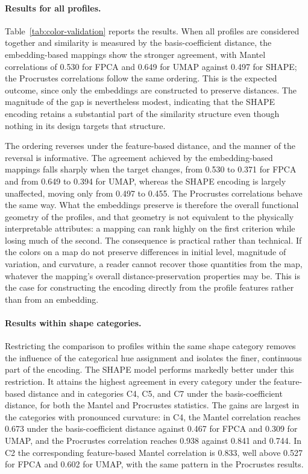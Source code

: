 \documentclass[11pt]{article}
\theoremstyle{plain}
\begin{document}
\paragraph{Results for all profiles.}
Table~\ref{tab:color-validation} reports the results. When all profiles are
considered together and similarity is measured by the basis-coefficient
distance, the embedding-based mappings show the stronger agreement, with Mantel
correlations of 0.530 for FPCA and 0.649 for UMAP against 0.497 for SHAPE; the
Procrustes correlations follow the same ordering. This is the expected outcome,
since only the embeddings are constructed to preserve distances. The magnitude
of the gap is nevertheless modest, indicating that the SHAPE encoding retains a
substantial part of the similarity structure even though nothing in its design
targets that structure.

The ordering reverses under the feature-based distance, and the manner of the
reversal is informative. The agreement achieved by the embedding-based mappings
falls sharply when the target changes, from 0.530 to 0.371 for FPCA and from
0.649 to 0.394 for UMAP, whereas the SHAPE encoding is largely unaffected,
moving only from 0.497 to 0.455. The Procrustes correlations behave the same
way. What the embeddings preserve is therefore the overall functional geometry
of the profiles, and that geometry is not equivalent to the physically
interpretable attributes: a mapping can rank highly on the first criterion while
losing much of the second. The consequence is practical rather than technical.
If the colors on a map do not preserve differences in initial level, magnitude
of variation, and curvature, a reader cannot recover those quantities from the
map, whatever the mapping's overall distance-preservation properties may be.
This is the case for constructing the encoding directly from the profile
features rather than from an embedding.

\paragraph{Results within shape categories.}
Restricting the comparison to profiles within the same shape category removes
the influence of the categorical hue assignment and isolates the finer,
continuous part of the encoding. The SHAPE model performs markedly better under
this restriction. It attains the highest agreement in every category under the
feature-based distance and in categories C4, C5, and C7 under the
basis-coefficient distance, for both the Mantel and Procrustes statistics. The
gains are largest in the categories with pronounced curvature: in C4, the Mantel
correlation reaches 0.673 under the basis-coefficient distance against 0.467 for
FPCA and 0.309 for UMAP, and the Procrustes correlation reaches 0.938 against
0.841 and 0.744. In C2 the corresponding feature-based Mantel correlation is
0.833, well above 0.527 for FPCA and 0.602 for UMAP, with the same pattern in
the Procrustes results.
\end{document}
